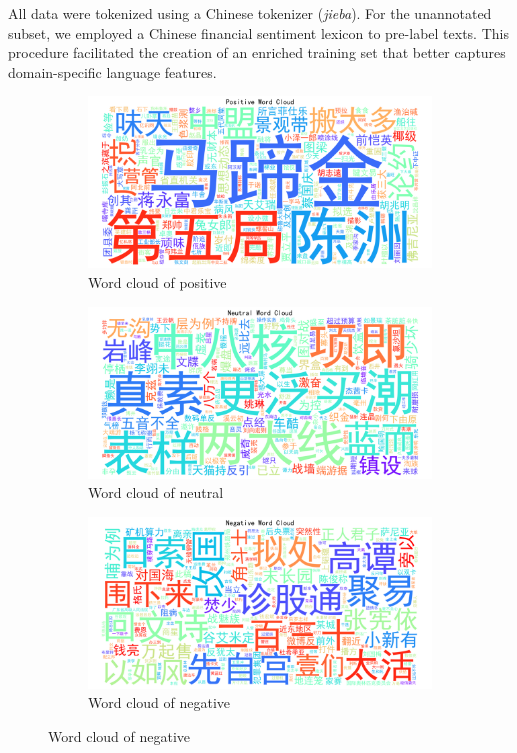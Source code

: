 \documentclass[12pt]{article}
\begin{document}
All data were tokenized using a Chinese tokenizer (\textit{jieba}). For the unannotated subset, we employed a Chinese financial sentiment lexicon to pre-label texts. This procedure facilitated the creation of an enriched training set that better captures domain-specific language features.
\begin{figure}[!ht]
	\centering
	\begin{subfigure}[b]{0.32\textwidth}
	\includegraphics[width=\linewidth]{wordcloud_positive.png}
	\caption{Word cloud of positive}
	\end{subfigure}
	\hfill
	\begin{subfigure}[b]{0.32\textwidth}
	\includegraphics[width=\linewidth]{wordcloud_neutral.png}
	\caption{Word cloud of neutral}
	\end{subfigure}
	\hfill
	\begin{subfigure}[b]{0.32\textwidth}
	\includegraphics[width=\linewidth]{wordcloud_negative.png}
	\caption{Word cloud of negative}
	\end{subfigure}
\end{figure}
\end{document}
